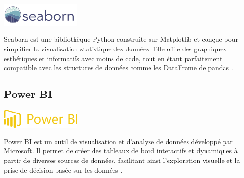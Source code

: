 \newpage
\includegraphics[width=4cm]{images/seaborn.png}

Seaborn est une bibliothèque Python construite sur Matplotlib et conçue pour simplifier la visualisation statistique des données. 
Elle offre des graphiques esthétiques et informatifs avec moins de code, tout en étant parfaitement compatible avec les structures de données comme les DataFrame de pandas \cite{seaborn}.








\subsection{Power BI}

\includegraphics[width=4cm]{images/powerbi.png}

Power BI est un outil de visualisation et d’analyse de données développé par Microsoft. 
Il permet de créer des tableaux de bord interactifs et dynamiques à partir de diverses sources de données, 
facilitant ainsi l'exploration visuelle et la prise de décision basée sur les données \cite{powerBI}.


